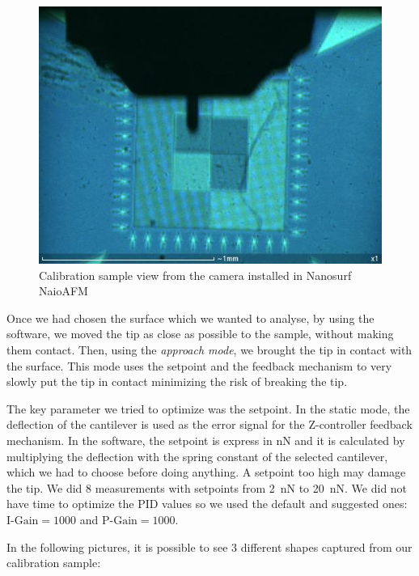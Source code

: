 \documentclass[11pt,a4paper]{article}
\begin{document}
\begin{figure}[ht]
\centering
\includegraphics[scale=0.4]{calibration_sample}
\caption{Calibration sample view from the camera installed in Nanosurf NaioAFM}
\label{fig:cal_sam}
\end{figure}

Once we had chosen the surface which we wanted to analyse, by using the software, we moved the tip as close as possible to the sample, without making them contact. Then, using the \emph{approach mode}, we brought the tip in contact with the surface. This mode uses the setpoint and the feedback mechanism to very slowly put the tip in contact minimizing the risk of breaking the tip.

The key parameter we tried to optimize was the setpoint. In the static mode, the deflection of the cantilever is used as the error signal for the Z-controller feedback mechanism. In the software, the setpoint is express in \si{\nano N} and it is calculated by multiplying the deflection with the spring constant of the selected cantilever, which we had to choose before doing anything. A setpoint too high may damage the tip. We did 8 measurements with setpoints from \SI{2}{\nano N} to \SI{20}{\nano N}. We did not have time to optimize the PID values so we used the default and suggested ones: $\text{I-Gain}=1000$ and $\text{P-Gain}=1000$.

In the following pictures, it is possible to see 3 different shapes captured from our calibration sample:
\end{document}
